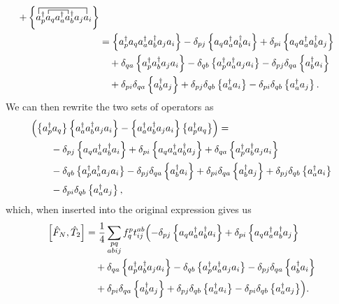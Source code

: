 \begin{align*}
        + \left\{ 
        \contraction{a^\dagger_p}{a}{{}_q a^\dagger_a}{a}
        \contraction[1.5ex]{}{a}{{}^\dagger_pa_q a^\dagger_a a^\dagger_b a_j}{a}
        a^\dagger_p a_q a^\dagger_a a^\dagger_b a_j a_i\right\} \\ 
        &= \normord{a^\dagger_p a_q a^\dagger_a a^\dagger_b a_j a_i}
        - \delta_{pj} \normord{a_q a^\dagger_a a^\dagger_b a_i}
        + \delta_{pi} \normord{a_q a^\dagger_a a^\dagger_b a_j} \\
        & \quad + \delta_{qa} \normord{a^\dagger_p a^\dagger_b a_j a_i}
        - \delta_{qb}\normord{a^\dagger_p a^\dagger_a a_j a_i} 
        - \delta_{pj} \delta_{qa} \normord{a^\dagger_b a_i} \\
        & \quad + \delta_{pi} \delta_{qa} \normord{a^\dagger_b a_j}
        + \delta_{pj} \delta_{qb} \normord{a^\dagger_a a_i}
        - \delta_{pi} \delta_{qb} \normord{a^\dagger_a a_j}.
    \end{align*}
 We can then rewrite the two sets of operators as
    \begin{align*}
        & \Bigl( \left\{a^\dagger_p a_q\right\} \left\{a^\dagger_a a^\dagger_b a_j a_i\right\}
            - \left\{a^\dagger_a a^\dagger_b a_j a_i\right\} \left\{a^\dagger_p a_q\right\} \Bigr) = \\
        & \qquad - \delta_{pj} \left\{a_q a^\dagger_a a^\dagger_b a_i\right\}
        + \delta_{pi} \left\{a_q a^\dagger_a a^\dagger_b a_j\right\}
        + \delta_{qa} \left\{a^\dagger_p a^\dagger_b a_j a_i\right\} \\
        & \qquad - \delta_{qb}\left\{a^\dagger_p a^\dagger_a a_j a_i\right\} 
        - \delta_{pj} \delta_{qa} \left\{a^\dagger_b a_i\right\}
        + \delta_{pi} \delta_{qa} \left\{a^\dagger_b a_j\right\}
        + \delta_{pj} \delta_{qb} \left\{a^\dagger_a a_i\right\} \\
        & \qquad - \delta_{pi} \delta_{qb} \left\{a^\dagger_a a_j\right\},
    \end{align*}
which, when    inserted into the original expression gives us
    \begin{align*}
        \left[ \hat{F}_N, \hat{T}_2 \right]
        &= \frac{1}{4} \sum_{\substack{pq\\abij}} f_q^p t_{ij}^{ab} \Bigl(
        - \delta_{pj} \left\{a_q a^\dagger_a a^\dagger_b a_i\right\}
        + \delta_{pi} \left\{a_q a^\dagger_a a^\dagger_b a_j\right\} \\
        & \quad + \delta_{qa} \left\{a^\dagger_p a^\dagger_b a_j a_i\right\}
        - \delta_{qb}\left\{a^\dagger_p a^\dagger_a a_j a_i\right\} 
        - \delta_{pj} \delta_{qa} \left\{a^\dagger_b a_i\right\} \\
        & \quad + \delta_{pi} \delta_{qa} \left\{a^\dagger_b a_j\right\}
        + \delta_{pj} \delta_{qb} \left\{a^\dagger_a a_i\right\}
        - \delta_{pi} \delta_{qb} \left\{a^\dagger_a a_j\right\} \Bigr).
    \end{align*}
